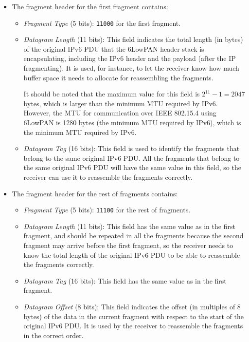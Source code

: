 \begin{itemize}
    \item The fragment header for the first fragment contains:
    \begin{itemize}
        \item \emph{Fragment Type} (5 bits): \texttt{11000} for the first fragment.
        \item \emph{Datagram Length} (11 bits): This field indicates the total length (in bytes) of the original IPv6 PDU that the 6LowPAN header stack is encapsulating, including the IPv6 header and the payload (after the IP fragmenting). It is used, for instance, to let the receiver know how much buffer space it needs to allocate for reassembling the fragments.
        
        It should be noted that the maximum value for this field is $2^{11}-1=2047$ bytes, which is larger than the minimum MTU required by IPv6. However, the MTU for communication over IEEE 802.15.4 using 6LowPAN is 1280 bytes (the minimum MTU required by IPv6), which is the minimum MTU required by IPv6.

        \item \emph{Datagram Tag} (16 bits): This field is used to identify the fragments that belong to the same original IPv6 PDU. All the fragments that belong to the same original IPv6 PDU will have the same value in this field, so the receiver can use it to reassemble the fragments correctly.
    \end{itemize}
    
    \item The fragment header for the rest of fragments contains:
    \begin{itemize}
        \item \emph{Fragment Type} (5 bits): \texttt{11100} for the rest of fragments.
        \item \emph{Datagram Length} (11 bits): This field has the same value as in the first fragment, and should be repeated in all the fragments because the second fragment may arrive before the first fragment, so the receiver needs to know the total length of the original IPv6 PDU to be able to reassemble the fragments correctly.
        \item \emph{Datagram Tag} (16 bits): This field has the same value as in the first fragment.
        \item \emph{Datagram Offset} (8 bits): This field indicates the offset (in multiples of 8 bytes) of the data in the current fragment with respect to the start of the original IPv6 PDU. It is used by the receiver to reassemble the fragments in the correct order.
        

\end{itemize}
\end{itemize}
